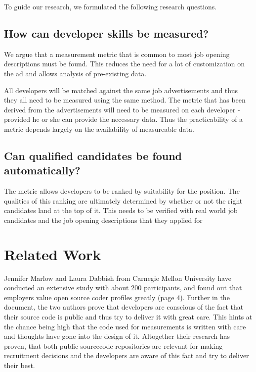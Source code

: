 To guide our research, we formulated the following research questions.

\subsection{How can developer skills be measured?}\label{subsec:dev-skill-measurement}
We argue that a measurement metric that is common to most job opening
descriptions must be found. This reduces the need for a lot of customization
on the ad and allows analysis of pre-existing data.
\newline

All developers will be matched against the same job advertisements and thus
they all need to be measured using the same method. The metric that
has been derived from the advertisements will need to be measured
on each developer - provided he or she can provide the necessary data.
Thus the practicability of a metric depends largely on the availability
of measureable data.

\subsection{Can qualified candidates be found automatically?}\label{subsec:measurement-quality}
The metric allows developers to be ranked by suitability for the position.
The qualities of this ranking are ultimately determined by whether
or not the right candidates land at the top of it. This needs to be
verified with real world job candidates and the job opening descriptions
that they applied for



\section{Related Work}

Jennifer Marlow and Laura Dabbish\cite{md:2013} from Carnegie Mellon
University have conducted an extensive study with about
200 participants, and found out that employers value
open source coder profiles greatly (page 4). Further in the document,
the two authors prove that developers are conscious of the fact
that their source code is public and thus try to deliver it with
great care. This hints at the chance being high that the code used for measurements
is written with care and thoughts have gone into the design of it.
Altogether their research has proven, that both public sourcecode repositories
are relevant for making recruitment decisions and the developers
are aware of this fact and try to deliver their best.
\newline

